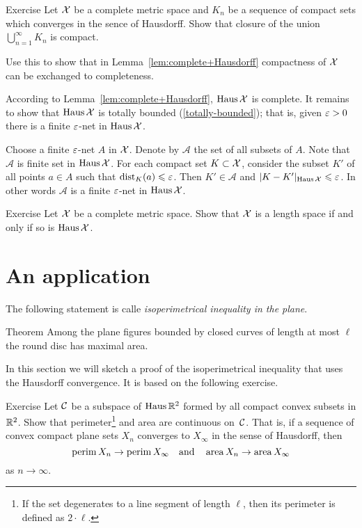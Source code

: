 \begin{thm}{Exercise}
Let $\mathcal{X}$ be a complete metric space and $K_n$ be a sequence of compact sets 
which converges in the sence of Hausdorff.
Show that closure of the union $\bigcup_{n=1}^\infty K_n$ is compact.

Use this to show that in Lemma~\ref{lem:complete+Hausdorff} compactness of $\mathcal{X}$ can be exchanged to completeness.
\end{thm}

According to Lemma~\ref{lem:complete+Hausdorff},
$\operatorname{\rm Haus}\nolimits\mathcal{X}$ is complete.
It remains to show that $\operatorname{\rm Haus}\nolimits\mathcal{X}$ is totally bounded (\ref{totally-bounded});
that is, given $\varepsilon>0$ there is a finite $\varepsilon$-net in $\operatorname{\rm Haus}\nolimits\mathcal{X}$.

Choose a finite $\varepsilon$-net $A$ in $\mathcal{X}$.
Denote by $\mathcal{A}$ the set of all subsets of $A$.
Note that  $\mathcal{A}$ is finite set in $\operatorname{\rm Haus}\nolimits\mathcal{X}$.
For each compact set $K\subset \mathcal{X}$, consider the subset $K'$ of all points $a\in A$
such that $\mathrm{dist}_K(a)\leqslant \varepsilon$.
Then $K' \in \mathcal{A}$ and $|K-K'|_{\operatorname{\rm Haus}\nolimits\mathcal{X}}\leqslant\varepsilon$.
In other words $\mathcal{A}$ is a finite $\varepsilon$-net in $\operatorname{\rm Haus}\nolimits\mathcal{X}$.
\qeds

\begin{thm}{Exercise}\label{ex:Haus-length}
Let $\mathcal{X}$ be a complete metric space.
Show that $\mathcal{X}$ is a length space if and only if so is $\operatorname{\rm Haus}\nolimits\mathcal{X}$.
\end{thm}

\section{An application}

The following statement is calle \emph{isoperimetrical inequality in the plane}.

\begin{thm}{Theorem}
Among the plane figures bounded by closed curves of length at most $\ell$ the round disc has maximal area.
\end{thm}

In this section we will sketch a proof of the isoperimetrical inequality that uses the Hausdorff convergence.
It is based on the following exercise.

\begin{thm}{Exercise}\label{ex:Huas-perimeter-area}
Let $\mathcal{C}$ be a subspace of $\operatorname{\rm Haus}\nolimits\mathbb{R}^2$ formed by all compact convex subsets in $\mathbb{R}^2$.
Show that perimeter\footnote{If the set degenerates to a line segment of length $\ell$, then its perimeter is defined as $2\cdot \ell$.} and area are continuous on~$\mathcal{C}$.
That is, if a sequence of convex compact plane sets $X_n$ converges to $X_\infty$ in the sense of Hausdorff, then 
\[\operatorname{\rm perim}\nolimits X_n\to \operatorname{\rm perim}\nolimits X_\infty\quad\text{and}\quad\operatorname{\rm area}\nolimits X_n\to\operatorname{\rm area}\nolimits X_\infty\]
as $n\to\infty$.
\end{thm}

